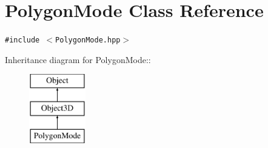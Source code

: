 \hypertarget{classm3g_1_1PolygonMode}{
\section{PolygonMode Class Reference}
\label{classm3g_1_1PolygonMode}
}
{\tt \#include $<$PolygonMode.hpp$>$}

Inheritance diagram for PolygonMode::\begin{figure}[H]
\begin{center}
\leavevmode
\includegraphics[height=3cm]{classm3g_1_1PolygonMode}
\end{center}
\end{figure}
